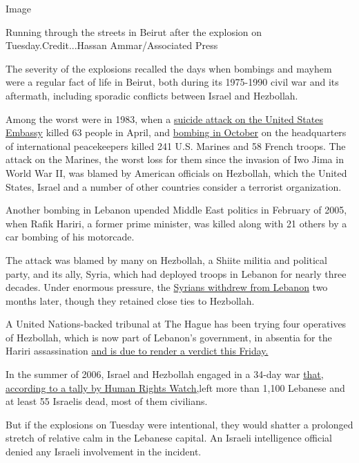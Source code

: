 Image

Running through the streets in Beirut after the explosion on
Tuesday.Credit...Hassan Ammar/Associated Press

The severity of the explosions recalled the days when bombings and
mayhem were a regular fact of life in Beirut, both during its 1975-1990
civil war and its aftermath, including sporadic conflicts between Israel
and Hezbollah.

Among the worst were in 1983, when a
\href{https://www.history.com/this-day-in-history/suicide-bomber-destroys-u-s-embassy-in-beirut}{suicide
attack on the United States Embassy} killed 63 people in April, and
\href{https://www.history.com/this-day-in-history/beirut-barracks-blown-up}{bombing
in October} on the headquarters of international peacekeepers killed 241
U.S. Marines and 58 French troops. The attack on the Marines, the worst
loss for them since the invasion of Iwo Jima in World War II, was blamed
by American officials on Hezbollah, which the United States, Israel and
a number of other countries consider a terrorist organization.

Another bombing in Lebanon upended Middle East politics in February of
2005, when Rafik Hariri, a former prime minister, was killed along with
21 others by a car bombing of his motorcade.

The attack was blamed by many on Hezbollah, a Shiite militia and
political party, and its ally, Syria, which had deployed troops in
Lebanon for nearly three decades. Under enormous pressure, the
\href{https://www.nytimes3xbfgragh.onion/2005/04/26/international/middleeast/syrian-troops-leave-lebanon-after-29year-occupation.html}{Syrians
withdrew from Lebanon} two months later, though they retained close ties
to Hezbollah.

A United Nations-backed tribunal at The Hague has been trying four
operatives of Hezbollah, which is now part of Lebanon's government, in
absentia for the Hariri assassination
\href{https://www.reuters.com/article/us-lebanon-tribunal-hariri/crisis-weary-lebanon-braces-for-hariri-tribunal-verdict-idUSKCN2500JU}{and
is due to render a verdict this Friday.}

In the summer of 2006, Israel and Hezbollah engaged in a 34-day war
\href{https://www.hrw.org/report/2007/09/05/why-they-died/civilian-casualties-lebanon-during-2006-war\#}{that,
according to a tally by Human Rights Watch,}left more than 1,100
Lebanese and at least 55 Israelis dead, most of them civilians.

But if the explosions on Tuesday were intentional, they would shatter a
prolonged stretch of relative calm in the Lebanese capital. An Israeli
intelligence official denied any Israeli involvement in the incident.

